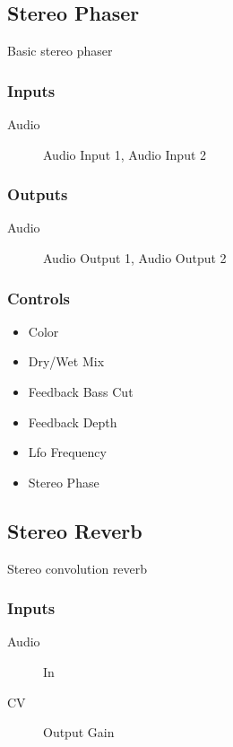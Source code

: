 \subsection{Stereo Phaser}

Basic stereo phaser



\subsubsection{Inputs}
\begin{description}
\item [Audio] Audio Input 1, Audio Input 2
\end{description}

\subsubsection{Outputs}
\begin{description}
\item [Audio] Audio Output 1, Audio Output 2
\end{description}

\subsubsection{Controls}
\begin{itemize}
\item Color
\item Dry/Wet Mix
\item Feedback Bass Cut
\item Feedback Depth
\item Lfo Frequency
\item Stereo Phase
\end{itemize}

\subsection{Stereo Reverb}

Stereo convolution reverb



\subsubsection{Inputs}
\begin{description}
\item [Audio] In
\item [CV] Output Gain
\end{description}

